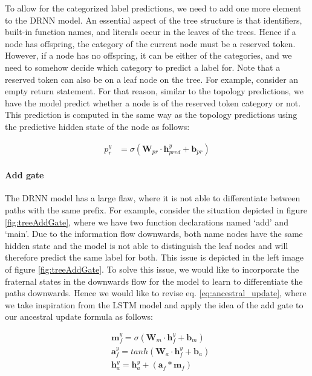 To allow for the categorized label predictions, we need to add one more element to the DRNN model. 
An essential aspect of the tree structure is that identifiers, built-in function names, and literals occur in the leaves of the trees. 
Hence if a node has offspring, the category of the current node must be a reserved token. 
However, if a node has no offspring, it can be either of the categories, and we need to somehow decide which category to predict a label for. Note that a reserved token can also be on a leaf node on the tree. For example, consider an empty return statement. For that reason, similar to the topology predictions, we have the model predict whether a node is of the reserved token category or not. This prediction  is computed in the same way as the topology predictions using the predictive hidden state of the node as follows: 

\begin{align}
    p_r^y &= \sigma(\mathbf{W}_{pr} \cdot \mathbf{h}_{pred}^y + \mathbf{b}_{pr}) \label{eq:res_pred}
\end{align}



\paragraph{Add gate} The DRNN model has a large flaw, where it is not able to differentiate between paths with the same prefix. For example, consider the situation depicted in figure \ref{fig:treeAddGate}, where we have two function declarations named `add' and `main'. Due to the information flow downwards, both name nodes have the same hidden state and the model is not able to distinguish the leaf nodes and will therefore predict the same label for both. This issue is depicted in the left image of figure \ref{fig:treeAddGate}. To solve this issue, we would like to incorporate the fraternal states in the downwards flow for the model to learn to differentiate the paths downwards. Hence we would like to revise eq. \ref{eq:ancestral_update}, where we take inspiration from the LSTM model and apply the idea of the add gate to our ancestral update formula as follows:

\begin{align}
    &\mathbf{m}_f^y = \sigma(\mathbf{W}_m \cdot \mathbf{h}_f^y + \mathbf{b}_m)\\
    &\mathbf{a}_f^y = tanh(\mathbf{W}_a \cdot \mathbf{h}_f^y + \mathbf{b}_a)\\
    &\mathbf{h}_a^y = \mathbf{h}_a^y + (\mathbf{a}_f * \mathbf{m}_f)
\end{align}

